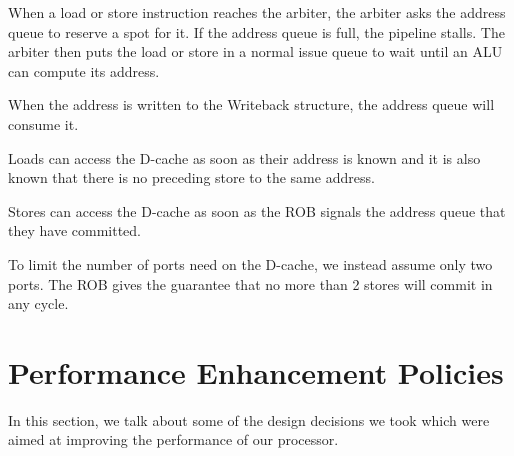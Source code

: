 \documentclass{article}
\begin{document}
When a load or store instruction reaches the arbiter, the arbiter asks the
address queue to reserve a spot for it. If the address queue is full, the
pipeline stalls. The arbiter then puts the load or store in a normal issue queue
to wait until an ALU can compute its address.

When the address is written to the Writeback structure, the address queue will
consume it.

Loads can access the D-cache as soon as their address is known and it is also
known that there is no preceding store to the same address.

Stores can access the D-cache as soon as the ROB signals the address queue that
they have committed.

To limit the number of ports need on the D-cache, we instead assume only two
ports. The ROB gives the guarantee that no more than 2 stores will commit in any
cycle.

\section{Performance Enhancement Policies}
\label{sec:perf-policies}

In this section, we talk about some of the design decisions we took which were
aimed at improving the performance of our processor. 
\end{document}
